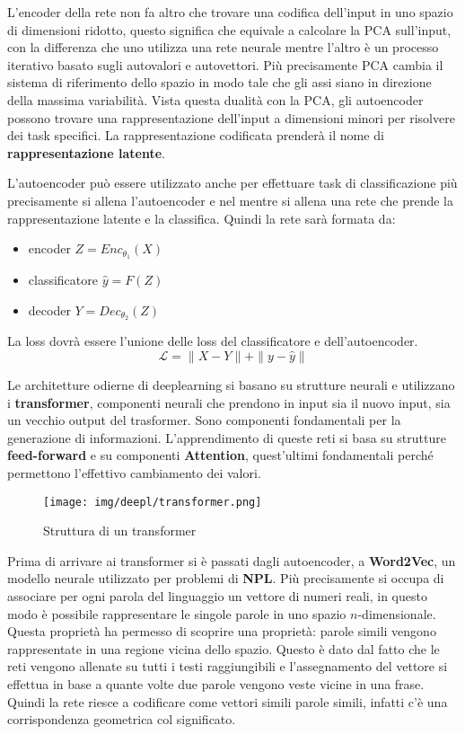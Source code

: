 L'encoder della rete non fa altro che trovare una codifica dell'input in uno spazio
di dimensioni ridotto, questo significa che equivale a calcolare la PCA sull'input,
con la differenza che uno utilizza una rete neurale mentre l'altro è un processo
iterativo basato sugli autovalori e autovettori. Più precisamente PCA cambia il
sistema di riferimento dello spazio in modo tale che gli assi siano in direzione
della massima variabilità. Vista questa dualità con la PCA, gli autoencoder possono
trovare una rappresentazione dell'input a dimensioni minori per risolvere dei task
specifici. La rappresentazione codificata prenderà il nome di \textbf{rappresentazione
      latente}.

L'autoencoder può essere utilizzato anche per effettuare task di classificazione
più precisamente si allena l'autoencoder e nel mentre si allena una rete che prende
la rappresentazione latente e la classifica. Quindi la rete sarà formata da:
\begin{itemize}
      \item encoder $Z = Enc_{\theta_1}(X)$
      \item classificatore $ \hat{y} = F(Z)$
      \item decoder $Y = Dec_{\theta_2}(Z)$
\end{itemize}
La loss dovrà essere l'unione delle loss del classificatore e dell'autoencoder.
\begin{equation}
      \mathcal{L} = \| X - Y \| + \| y - \hat{y} \|
\end{equation}

Le architetture odierne di deeplearning si basano su strutture neurali e utilizzano i
\textbf{transformer}, componenti neurali che prendono in input sia il nuovo input,
sia un vecchio output del trasformer. Sono componenti fondamentali per la generazione
di informazioni. L'apprendimento di queste reti si basa su strutture \textbf{feed-forward}
e su componenti \textbf{Attention}, quest'ultimi fondamentali perché permettono
l'effettivo cambiamento dei valori.
\begin{figure}[!ht]
      \centering
      \texttt{[image: img/deepl/transformer.png]}
      \caption{Struttura di un transformer}
      \label{fig:transformer}
\end{figure}
Prima di arrivare ai transformer si è passati dagli autoencoder, a \textbf{Word2Vec},
un modello neurale utilizzato per problemi di \textbf{NPL}. Più precisamente si occupa
di associare per ogni parola del linguaggio un vettore di numeri reali, in questo
modo è possibile rappresentare le singole parole in uno spazio $n$-dimensionale.
Questa proprietà ha permesso di scoprire una proprietà: parole simili vengono
rappresentate in una regione vicina dello spazio. Questo è dato dal fatto che
le reti vengono allenate su tutti i testi raggiungibili e l'assegnamento del vettore
si effettua in base a quante volte due parole vengono veste vicine in una frase.
Quindi la rete riesce a codificare come vettori simili parole simili, infatti c'è
una corrispondenza geometrica col significato.

